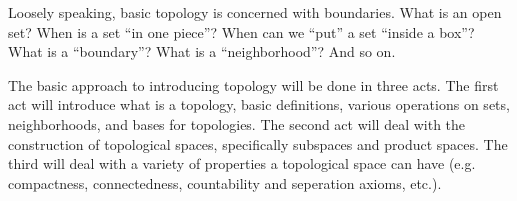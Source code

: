 
Loosely speaking, basic topology is concerned with
boundaries. What is an open set? When is a set ``in one piece''?
When can we ``put'' a set ``inside a box''? What is a
``boundary''? What is a ``neighborhood''? And so on.

The basic approach to introducing topology will be done in three
acts. The first act will introduce what is a topology, basic
definitions, various operations on sets, neighborhoods, and bases
for topologies. The second act will deal with the construction of
topological spaces, specifically subspaces and product
spaces. The third will deal with a variety of properties a
topological space can have (e.g. compactness, connectedness,
countability and seperation axioms, etc.).
